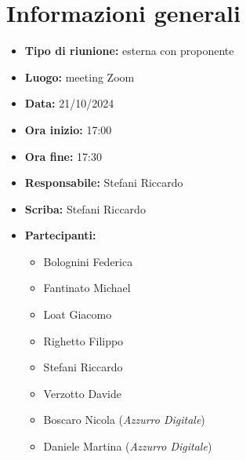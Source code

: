 \section{Informazioni generali}

\begin{itemize}
    \item \textbf{Tipo di riunione:} esterna con proponente
    \item \textbf{Luogo:} meeting Zoom
    \item \textbf{Data:} 21/10/2024
    \item \textbf{Ora inizio:} 17:00
    \item \textbf{Ora fine:} 17:30
    \item \textbf{Responsabile:} Stefani Riccardo
    \item \textbf{Scriba:} Stefani Riccardo
    \item \textbf{Partecipanti:}
    \begin{itemize}
        \renewcommand{\labelitemii}{--}
        \item Bolognini Federica
        \item Fantinato Michael
        \item Loat Giacomo
        \item Righetto Filippo
        \item Stefani Riccardo
        \item Verzotto Davide
        \item Boscaro Nicola (\emph{Azzurro Digitale})
        \item Daniele Martina (\emph{Azzurro Digitale})
    \end{itemize}
\end{itemize}
